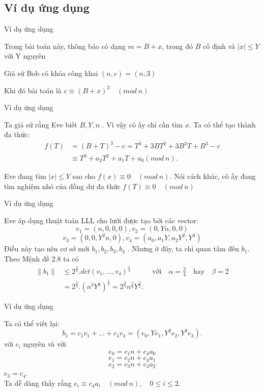 \documentclass{beamer}
\begin{document}
\subsection{Ví  dụ ứng dụng}
\begin{frame}{Ví dụ ứng dụng}

Trong bài toán này, thông báo có dạng $m = B + x$, trong đó $B$ cố định và $|x| \leq Y$ với Y nguyên

Giả sử Bob có khóa công khai $(n, e) = (n, 3)$

Khi đó bài toán là $c \equiv (B+x)^3 \quad (mod \ n)$
\end{frame}
\begin{frame}{Ví dụ ứng dụng}

Ta giả sử rằng Eve biết $B, Y, n$ . Vì vậy cô ấy chỉ cần tìm $x$. Ta có thể tạo thành đa thức:
$$
\begin{aligned}
f(T) & = (B+T)^3 - c = T^3 + 3BT^2 + 3B^2T + B^3 -c\\
& \equiv T^3 + a_2T^2 + a_1T + a_0 (mod \ n).
\end{aligned}
$$

Eve đang tìm $|x| \leq Y$ sao cho $f(x) \equiv 0 \quad (mod \ n)$. Nói cách khác, cô ấy đang tìm nghiệm nhỏ của đồng dư đa thức $f(T) \equiv 0 \quad (mod \ n)$
\end{frame}
\begin{frame}{Ví dụ ứng dụng}

Eve áp dụng thuật toán LLL cho lưới được tạo bởi các vector:
$$v_1 =(n, 0, 0, 0), v_2 = (0, Yn, 0, 0) $$
$$ v_3 = (0, 0, Y^2n, 0), v_4 = (a_0, a_1Y, a_2Y^2, Y^3)$$
Điều này tạo nên cơ sở mới $b_1, b_2, b_3, b_4$ . Nhưng ở đây, ta chỉ quan tâm đến $b_1$. Theo Mệnh đề 2.8 ta có
$$
\begin{aligned}
\|b_1\| & \leq 2^{\tfrac{3}{4}}.det(v_1, ..., v_4)^{\tfrac{1}{4}} \qquad \quad \text{với} \quad \alpha = \frac{3}{4} \quad \text{hay} \quad \beta = 2 \\
& = 2^{\tfrac{3}{4}}.(n^{3}Y^{6})^{\tfrac{1}{4}} = 2^{\tfrac{3}{4}}n^{\tfrac{3}{4}}Y^{\tfrac{3}{2}} \text{.}
\end{aligned}
$$

\end{frame}
\begin{frame}{Ví dụ ứng dụng}

Ta có thể viết lại:
$$b_1 = c_1v_1 + ... + c_4v_4 = (e_0, Ye_1, Y^2e_2, Y^3e_3)\text{.}$$
với $c_i$ nguyên và với $$e_0 = c_1n + c_4a_0$$ $$e_1 = c_2n + c_4a_1$$ $$e_2 = c_3n + c_4a_2$$
\hspace*{7cm} $e_3 = c_4$.\\
Ta dễ dàng thấy rằng $e_i \equiv c_4a_i\quad (mod \ n), \quad 0\leq i\leq 2$. \\

\end{frame}
\end{document}

